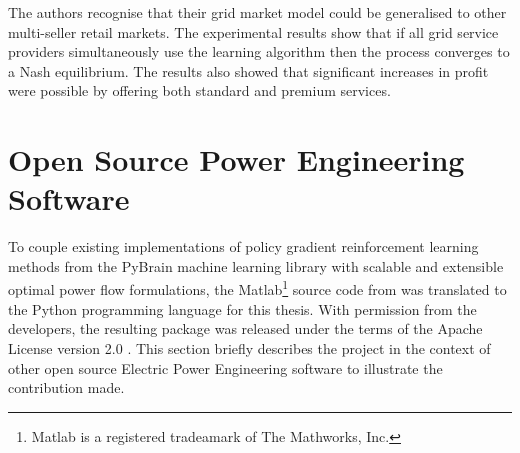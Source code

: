 The authors recognise that their grid market model could be generalised to
other multi-seller retail markets.  The experimental results show that if
all grid service providers simultaneously use the learning algorithm then the
process converges to a Nash equilibrium.  The results also showed that
significant increases in profit were possible by offering both standard and
premium services.



\newpage
\section{Open Source Power Engineering Software}
\label{sec:oss}
To couple existing implementations of policy gradient reinforcement learning
methods from the PyBrain machine learning library \cite{schaul:2010} with
scalable and extensible optimal power flow formulations, the
Matlab\footnote{Matlab is a registered tradeamark of The Mathworks, Inc.}
source code from \matpower was translated to the Python programming language
for this thesis. With permission from the \matpower developers, the resulting
package was released under the terms of the Apache License version 2.0
\cite{lincoln:pyreto}.  This section briefly describes the project in the
context of other open source Electric Power Engineering software to illustrate the
contribution made.

